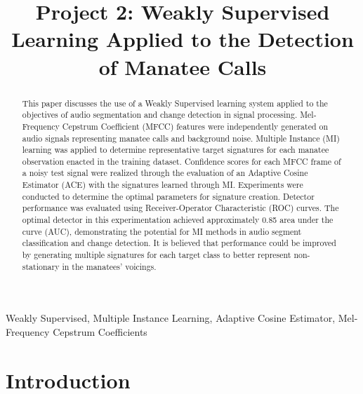 \documentclass[conference]{IEEEtran}
\begin{document}
\title{Project 2: Weakly Supervised Learning Applied to the Detection of Manatee Calls}
\author{

}

\maketitle


\begin{abstract}
  This paper discusses the use of a Weakly Supervised learning system applied to the objectives of audio segmentation and change detection in signal processing.  Mel-Frequency Cepstrum Coefficient (MFCC) features were independently generated on audio signals representing manatee calls and background noise.  Multiple Instance (MI) learning was applied to determine representative target signatures for each manatee observation enacted in the training dataset. Confidence scores for each MFCC frame of a noisy test signal were realized through the evaluation of an Adaptive Cosine Estimator (ACE) with the signatures learned through MI.  Experiments were conducted to determine the optimal parameters for signature creation.  Detector performance  was evaluated using  Receiver-Operator Characteristic (ROC) curves.  The optimal detector in this experimentation achieved approximately 0.85 area under the curve (AUC), demonstrating the potential for MI methods in audio segment classification and change detection.  It is believed that performance could be improved by generating multiple signatures for each target class to better represent non-stationary in the manatees' voicings.
\end{abstract} 

\begin{IEEEkeywords}
Weakly Supervised, Multiple Instance Learning, Adaptive Cosine Estimator, Mel-Frequency Cepstrum Coefficients
\end{IEEEkeywords}


\section{Introduction} 
\end{document}
